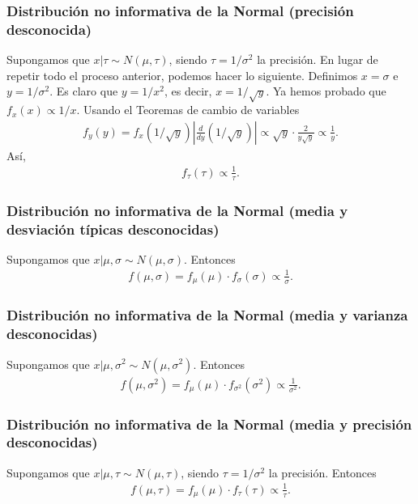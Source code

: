 \subsubsection{Distribución no informativa de la Normal (precisión desconocida)}
Supongamos que $x | \tau \sim N(\mu,\tau)$, siendo $\tau = 1/\sigma^2$ la precisión. En lugar de repetir todo el proceso anterior, podemos hacer lo siguiente. Definimos $x = \sigma$ e $y = 1/\sigma^2$. Es claro que $y = 1/x^2$, es decir, $x = 1/\sqrt{y}$. Ya hemos probado que $f_{x}(x) \propto 1/x$. Usando el Teoremas de cambio de variables
\begin{align*}
    f_y(y) = f_x\left( 1/\sqrt{y} \right) \left| \frac{d}{dy} \left( 1/\sqrt{y} \right) \right| \propto \sqrt{y} \cdot \frac{2}{y\sqrt{y}} \propto \frac{1}{y}.
\end{align*}
Así,
\begin{align*}
    f_{\tau}(\tau) \propto \frac{1}{\tau}.
\end{align*}

\subsubsection{Distribución no informativa de la Normal (media y desviación típicas desconocidas)}
Supongamos que $x | \mu,\sigma \sim N(\mu,\sigma)$. Entonces
\begin{align*}
    f(\mu,\sigma) = f_{\mu}(\mu) \cdot f_{\sigma}(\sigma) \propto \frac{1}{\sigma}.
\end{align*}

\subsubsection{Distribución no informativa de la Normal (media y varianza desconocidas)}
Supongamos que $x | \mu,\sigma^2 \sim N(\mu,\sigma^2)$. Entonces
\begin{align*}
    f(\mu,\sigma^2) = f_{\mu}(\mu) \cdot f_{\sigma^2}(\sigma^2) \propto \frac{1}{\sigma^2}.
\end{align*}
\subsubsection{Distribución no informativa de la Normal (media y precisión desconocidas)}
Supongamos que $x | \mu,\tau \sim N(\mu,\tau)$, siendo $\tau = 1/\sigma^2$ la precisión. Entonces
\begin{align*}
    f(\mu,\tau) = f_{\mu}(\mu) \cdot f_{\tau}(\tau) \propto \frac{1}{\tau}.
\end{align*}

